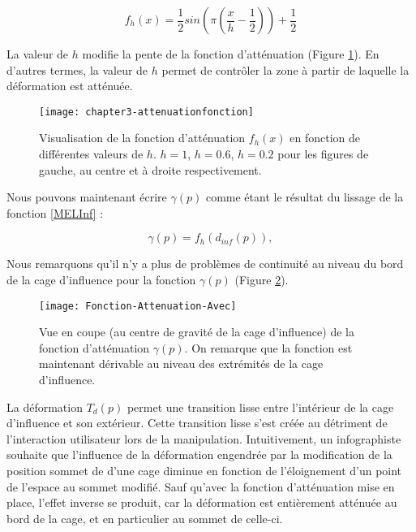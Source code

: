 \begin{equation}
  f_h(x) = \frac{1}{2} sin(\pi(\frac{x}{h} - \frac{1}{2})) + \frac{1}{2}
\end{equation}

La valeur de $h$ modifie la pente de la fonction d'atténuation (Figure
\ref{MELFAt}). En d'autres termes, la valeur de $h$ permet de contrôler la
zone à partir de laquelle la déformation est atténuée.

\begin{figure}[!ht]
\texttt{[image: chapter3-attenuationfonction]}

\caption[Fonction d'atténuation $f_h(x)$] {Visualisation de la fonction
d'atténuation $f_h(x)$ en fonction de différentes valeurs de $h$. $h=1$,
$h=0.6$, $h=0.2$ pour les figures de gauche, au centre et à droite
respectivement.}

\label{MELFAt}
\end{figure}

Nous pouvons maintenant écrire $\gamma(p)$ comme étant le résultat du lissage
de la fonction \ref{MELInf} :

\begin{equation}
  \gamma(p) = f_h(d_{inf}(p)),
\end{equation}

Nous remarquons qu'il n'y a plus de problèmes de continuité au niveau du bord
de la cage d'influence pour la fonction $\gamma(p)$ (Figure \ref{MELAtL}).

\begin{figure}[!ht]
\texttt{[image: Fonction-Attenuation-Avec]}

\caption[Fonction d'atténuation $\gamma$(p)] {Vue en coupe (au centre de
gravité de la cage d'influence) de la fonction d'atténuation $\gamma(p)$. On
remarque que la fonction est maintenant dérivable au niveau des extrémités de
la cage d'influence.}

\label{MELAtL}
\end{figure}

La déformation $T_d(p)$ permet une transition lisse entre l'intérieur de la
cage d'influence et son extérieur. Cette transition lisse s'est créée au
détriment de l'interaction utilisateur lors de la manipulation. Intuitivement,
un infographiste souhaite que l'influence de la déformation engendrée par la
modification de la position sommet de d'une cage diminue en fonction de
l'éloignement d'un point de l'espace au sommet modifié. Sauf qu'avec la
fonction d'atténuation mise en place, l'effet inverse se produit, car la
déformation est entièrement atténuée au bord de la cage, et en particulier au
sommet de celle-ci.

